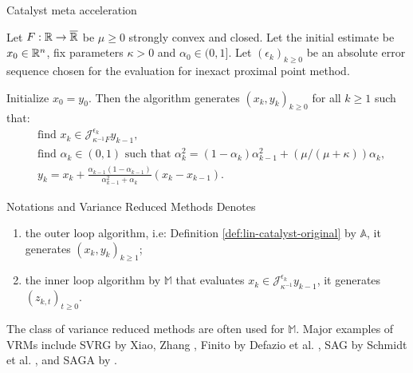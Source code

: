 \documentclass[11pt]{beamer}
\theoremstyle{definition}
\begin{document}
        \begin{frame}{Catalyst meta acceleration}
            \begin{definition}\label{def:lin-catalyst-original}
                Let $F:\mathbb R \rightarrow \overline {\mathbb R}$ be $\mu \ge 0$ strongly convex and closed. 
                Let the initial estimate be $x_0 \in \mathbb R^n$, fix parameters $\kappa > 0$ and $\alpha_0 \in (0, 1]$. 
                Let $(\epsilon_k)_{k \ge 0}$ be an absolute error sequence chosen for the evaluation for inexact proximal point method. 
                {\small
                \begin{tcolorbox}
                    Initialize $x_0 = y_0$. Then the algorithm generates $(x_k, y_k)_{k\ge 0}$ for all $k \ge 1$ such that: 
                    \begin{align*}
                        & \text{find } x_k \in \mathcal J_{\kappa^{-1}F}^{\epsilon_k} y_{k - 1}, 
                        \\
                        & \text{find } \alpha_k \in (0, 1) \text{ such that } \alpha_k^2 = (1 - \alpha_k)\alpha_{k - 1}^2 + (\mu/(\mu + \kappa))\alpha_k,
                        \\
                        & 
                        y_{k} = x_k + \frac{\alpha_{k - 1}(1 - \alpha_{k - 1})}{\alpha_{k - 1}^2 + \alpha_k}(x_k - x_{k - 1}). 
                    \end{align*}
                \end{tcolorbox}
                }
            \end{definition}
        \end{frame}
        \begin{frame}{Notations and Variance Reduced Methods}
            Denotes
            \begin{enumerate}
                \item the outer loop algorithm, i.e: Definition \ref{def:lin-catalyst-original} by $\mathbb A$, it generates $(x_k, y_k)_{k \ge 1}$; 
                \item the inner loop algorithm by $\mathbb M$ that evaluates $x_k \in \mathcal J_{\kappa^{-1}}^{\epsilon_k} y_{k - 1}$, it generates $(z_{k, t})_{t \ge 0}$. 
            \end{enumerate}
            The class of variance reduced methods are often used for $\mathbb M$. 
            Major examples of VRMs include SVRG by Xiao, Zhang \cite{xiao_proximal_2014}, Finito by Defazio et al. \cite{defazio_finito_2014}, SAG by Schmidt et al. \cite{schmidt_minimizing_2017}, and SAGA by \cite{defazio_saga_2014}. 
        \end{frame}
\end{document}
